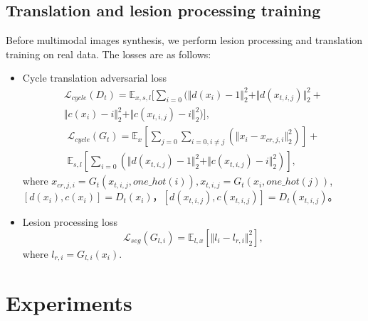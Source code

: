 \documentclass[runningheads]{llncs}
\begin{document}
\subsection{Translation and lesion processing training}
Before multimodal images synthesis, we perform lesion processing and translation training on real data. The losses are as follows:
\begin{itemize}
	\item{Cycle translation adversarial loss}
	\begin{equation}
	\begin{split}
	\mathcal{L}_{cycle}(D_t)=\mathbb{E}_{x,s,l}[\sum\limits_{i=0}(\Vert{d(x_i)-1}\Vert_{2}^{2}+\Vert{d(x_{t,i,j})}\Vert_{2}^{2}+\\
	\Vert{c(x_i)-i}\Vert_{2}^{2}+\Vert{c(x_{t,i,j})-i}\Vert_{2}^{2})],
	\end{split}
	\end{equation}
	\begin{equation}
	\begin{split}
	\mathcal{L}_{cycle}(G_t)=\mathbb{E}_{x}[\sum\limits_{j=0}\sum\limits_{i=0,i\neq j}(\Vert{x_{i}-x_{cr,j,i}}\Vert_{2}^{2})]+\\\mathbb{E}_{s,l}[\sum\limits_{i=0}(\Vert{d(x_{t,i,j})-1}\Vert_{2}^{2}+\Vert{c(x_{t,i,j})-i}\Vert_{2}^{2})],
	\end{split}
	\end{equation}
	where $x_{cr,j,i}=G_t(x_{t,i,j},one\_hot(i)),x_{t,i,j}=G_t(x_{i},one\_hot(j))$,
	$[d(x_{i}),c(x_{i})]=D_t(x_{i})$，$[d(x_{t,i,j}),c(x_{t,i,j})]=D_t(x_{t,i,j})$。
	
	\item{Lesion processing loss}
	\begin{equation}
	\label{lesion segmentation loss}
	\mathcal{L}_{seg}(G_{l,i})=\mathbb{E}_{l,x}[\Vert{l_i-l_{r,i}}\Vert_{2}^{2}],
	\end{equation}
	where $l_{r,i}=G_{l,i}(x_{i})$.
\end{itemize}

\section{Experiments}
\end{document}
